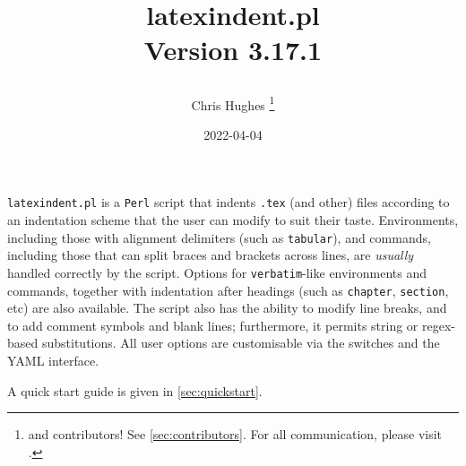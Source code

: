 \title{%
	\begin{tcolorbox}[
			width=5.2cm,
			boxrule=0pt,
			colframe=white!40!black,
			colback=white,
			rightrule=2pt,
			sharp corners,
			enhanced,
			overlay={\node[anchor=north east,outer sep=2pt] at ([xshift=3cm,yshift=4mm]frame.north east) {\texttt{[image: logo]}}; }]
		\centering\ttfamily\bfseries latexindent.pl\\[1cm] Version 3.17.1
	\end{tcolorbox}
}
\author{Chris Hughes \thanks{and contributors!
		See \vref{sec:contributors}.
		For
		all communication, please visit \cite{latexindent-home}.}}
\date{2022-04-04}
\maketitle
\begin{adjustwidth}{1cm}{1cm}
	\small
	\texttt{latexindent.pl} is a \texttt{Perl} script that indents \texttt{.tex} (and other) files according to an indentation scheme that the user can modify to suit their taste.
	Environments, including those with alignment delimiters (such as \texttt{tabular}), and commands, including those that can split braces and brackets across lines, are \emph{usually} handled correctly by the script.
	Options for \texttt{verbatim}-like environments and commands, together with indentation after headings (such as \lstinline!chapter!, \lstinline!section!, etc) are also available.
	The script also has the ability to modify line breaks, and to add comment symbols and blank lines; furthermore, it permits string or
	regex-based substitutions.
	All user options are customisable via the switches and the YAML interface. 

    A quick start guide is given in \vref{sec:quickstart}.
\end{adjustwidth}
